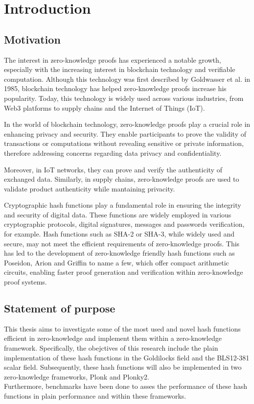 \chapter{Introduction}
\section{Motivation}
The interest in zero-knowledge proofs has experienced a notable growth, especially with the increasing interest in blockchain technology and verifiable computation. Although this technology was first described by Goldwasser et al. in 1985, blockchain technology has helped zero-knowledge proofs increase his popularity. Today, this technology is widely used across various industries, from Web3 platforms to supply chains and the Internet of Things (IoT).

In the world of blockchain technology, zero-knowledge proofs play a crucial role in enhancing privacy and security. They enable participants to prove the validity of transactions or computations without revealing sensitive or private information, therefore addressing concerns regarding data privacy and confidentiality.

Moreover, in IoT networks, they can prove and verify the authenticity of exchanged data. Similarly, in supply chains, zero-knowledge proofs are used to validate product authenticity while mantaining privacity.

Cryptographic hash functions play a fundamental role in ensuring the integrity and security of digital data. These functions are widely employed in various cryptographic protocols, digital signatures, messages and passwords verification, for example.
Hash functions such as SHA-2 or SHA-3, while widely used and secure, may not meet the efficient requirements of zero-knowledge proofs. This has led to the development of zero-knowledge friendly hash functions such as Poseidon, Arion and Griffin to name a few, which offer compact arithmetic circuits, enabling faster proof generation and verification within zero-knowledge proof systems. 

\section{Statement of purpose}
This thesis aims to investigate some of the most used and novel hash functions efficient in zero-knowledge and implement them within a zero-knowledge framework. Specifically, the obejctives of this research include the plain implementation of these hash functions in the Goldilocks field and the BLS12-381 scalar field. Subsequently, these hash functions will also be implemented in two zero-knowledge frameworks, Plonk and Plonky2.\\
Furthermore, benchmarks have been done to asses the performance of these hash functions in plain performance and within these frameworks.

